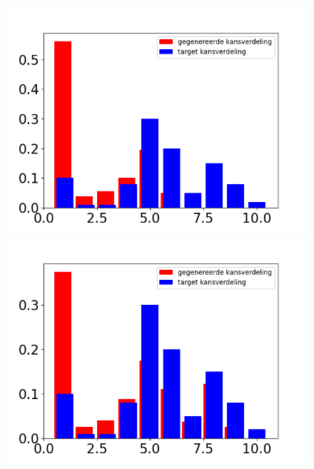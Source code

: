 \begin{figure}
\begin{minipage}{0.49\linewidth}
        \includegraphics[width=\linewidth]{Figures/goede_visualisatie_3/visualisatie_180.png} 
    \end{minipage}
    \hfill
    \begin{minipage}{0.49\linewidth}
        \includegraphics[width=\linewidth]{Figures/goede_visualisatie_3/visualisatie_270.png}
    \end{minipage}
    \begin{minipage}{0.49\linewidth}

\end{minipage}
\end{figure}
